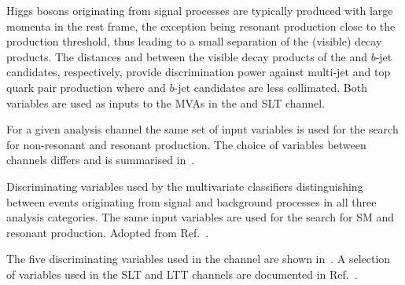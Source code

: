 Higgs bosons originating from signal processes are typically produced
with large momenta in the \HH rest frame, the exception being resonant
\HH production \mX close to the \HH production threshold, thus leading
to a small separation of the (visible) \PHiggs decay products. The
distances \dRtautau and \dRbb between the visible decay products of
the \tauleptons and $b$-jet candidates, respectively, provide
discrimination power against multi-jet and top quark pair production
where \tauleptons and $b$-jet candidates are less collimated. Both
variables are used as inputs to the MVAs in the \hadhad and \lephad
SLT channel.

For a given analysis channel the same set of input variables is used
for the search for non-resonant and resonant \HH production. The
choice of variables between channels differs and is summarised
in~.

\begin{table}[htbp]
  \centering

  \caption{Discriminating variables used by the multivariate
    classifiers distinguishing between events originating from signal
    and background processes in all three analysis categories. The
    same input variables are used for the search for SM \HH and
    resonant \HH production. Adopted from
    Ref.~\cite{ATLAS-CONF-2021-030}.}%
  \label{tab:mva_inputvar}

  
\end{table}


The five discriminating variables used in the \hadhad channel are
shown in~. A selection of variables used in the
\lephad SLT and LTT channels are documented in
Ref.~\cite{ATLAS-CONF-2021-030}.

